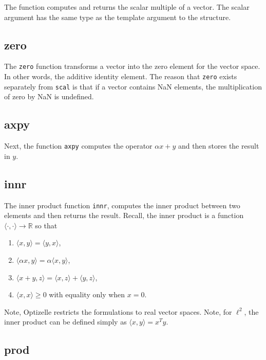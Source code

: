 \documentclass{report}
\newcommand{\re}{\mathbb{R}}
\begin{document}
        The  function computes and returns the scalar multiple of a vector.  The scalar argument has the same type as the template argument to the structure.

\subsection{zero}

        The \texttt{zero} function transforms a vector into the zero element for the vector space.  In other words, the additive identity element.  The reason that \texttt{zero} exists separately from \texttt{scal} is that if a vector contains NaN elements, the multiplication of zero by NaN is undefined.

\subsection{axpy}

        Next, the function \texttt{axpy} computes the operator $\alpha x + y$ and then stores the result in $y$.

\subsection{innr}

        The inner product function \texttt{innr}, computes the inner product between two elements and then returns the result.  Recall, the inner product is a function $\langle \cdot,\cdot \rangle\rightarrow \re$ so that
\begin{enumerate}
    \item $\langle x,y\rangle = \langle y,x \rangle$,
    \item $\langle \alpha x,y\rangle = \alpha \langle x,y\rangle$,
    \item $\langle x+y,z\rangle = \langle x,z\rangle + \langle y,z\rangle$,
    \item $\langle x,x\rangle\geq 0$ with equality only when $x=0$.
\end{enumerate}
Note, Optizelle restricts the formulations to real vector spaces.  Note, for $\ell^2$, the inner product can be defined simply as $\langle x,y\rangle=x^Ty$.

\subsection{prod}
\end{document}
